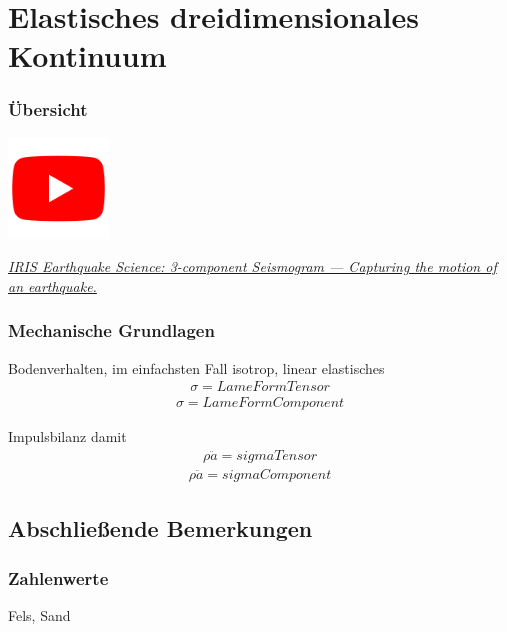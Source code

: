 \documentclass[hyperref={pdfpagemode=FullScreen, colorlinks=false}]{beamer}
\begin{document}
\maketitle

\section{Elastisches dreidimensionales Kontinuum}

\begin{frame}
\frametitle{Übersicht}
\begin{center}
\includegraphics[width=0.2\textwidth]{fig_img/youtube.png}   
\end{center}

\href{https://www.youtube.com/watch?v=Za_22xo7ZQQ}{\textsl{IRIS Earthquake Science: 3-component Seismogram --- Capturing the motion of an earthquake.}}

\end{frame}

\begin{frame}
\frametitle{Mechanische Grundlagen}
Bodenverhalten, im einfachsten Fall isotrop, linear elastisches
\begin{align*}
 \sigma = LameFormTensor
\end{align*}
\begin{align*}
 \sigma = LameFormComponent
\end{align*}

Impulsbilanz damit
\begin{align*}
 \rho \ddot{a} =sigmaTensor
\end{align*}
\begin{align*}
 \rho \ddot{a} =sigmaComponent
\end{align*}


\end{frame}






\subsection{Abschließende Bemerkungen}
\begin{frame}
\frametitle{Zahlenwerte}
Fels, Sand
\end{frame}
\end{document}
